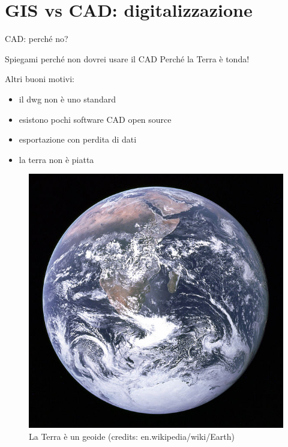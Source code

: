 \documentclass{beamer}
\begin{document}
	\section{GIS vs CAD: digitalizzazione}

		\begin{frame}{CAD: perché no?}
			\begin{block}{Spiegami perché non dovrei usare il CAD}
				Perché la Terra è tonda!
			\end{block}
			\begin{multicols}{2}[][]
				Altri buoni motivi:
				\begin{itemize}
					\item il dwg non è uno standard
					\item esistono pochi software CAD open source
					\item esportazione con perdita di dati
					\item la terra non è piatta
				\end{itemize}
				\columnbreak
				\begin{figure}[]
					\begin{center}
					\includegraphics[width=1\linewidth]{earth}
					\end{center}
					\caption{La Terra è un geoide (credits: en.wikipedia/wiki/Earth)}
					\label{fig:earth}
				\end{figure}
			\end{multicols}
		\end{frame}
\end{document}
